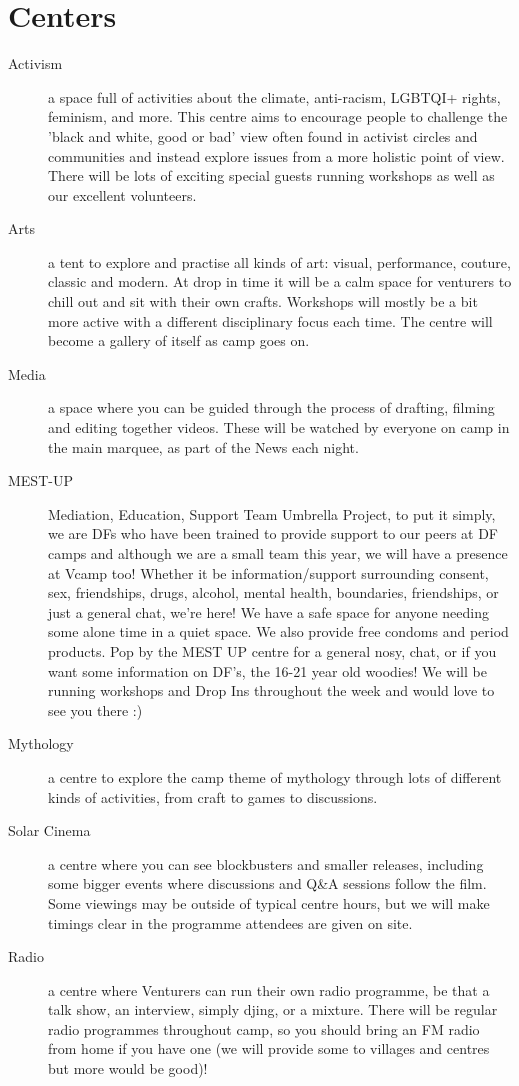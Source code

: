 \documentclass[a4paper, 11pt]{report}
\begin{document}
\section{Centers}
\begin{description}
    \item[Activism] a space full of activities about the climate, anti-racism, LGBTQI+ rights, feminism, and more. This centre aims to encourage people to challenge the 'black and white, good or bad' view often found in activist circles and communities and instead explore issues from a more holistic point of view. There will be lots of exciting special guests running workshops as well as our excellent volunteers.
    \item[Arts] a tent to explore and practise all kinds of art: visual, performance, couture, classic and modern. At drop in time it will be a calm space for venturers to chill out and sit with their own crafts. Workshops will mostly be a bit more active with a different disciplinary focus each time. The centre will become a gallery of itself as camp goes on.
    \item[Media] a space where you can be guided through the process of drafting, filming and editing together videos. These will be watched by everyone on camp in the main marquee, as part of the News each night.
    \item[MEST-UP] Mediation, Education, Support Team Umbrella Project, to put it simply, we are DFs who have been trained to provide support to our peers at DF camps and although we are a small team this year, we will have a presence at Vcamp too! Whether it be information/support surrounding consent, sex, friendships, drugs, alcohol, mental health, boundaries, friendships, or just a general chat, we're here! We have a safe space for anyone needing some alone time in a quiet space. We also provide free condoms and period products. Pop by the MEST UP centre for a general nosy, chat, or if you want some information on DF's, the 16-21 year old woodies! We will be running workshops and Drop Ins throughout the week and would love to see you there :)
    \item[Mythology] a centre to explore the camp theme of mythology through lots of  different kinds of activities, from craft to games to discussions.
    \item[Solar Cinema] a centre where you can see blockbusters and smaller releases, including some bigger events where discussions and Q\&A sessions follow the film. Some viewings may be outside of typical centre hours, but we will make timings clear in the programme attendees are given on site.
    \item[Radio] a centre where Venturers can run their own radio programme, be that a talk show, an interview, simply djing, or a mixture. There will be regular radio programmes throughout camp, so you should bring an FM radio from home if you have one (we will provide some to villages and centres but more would be good)!
\end{description}
\end{document}
